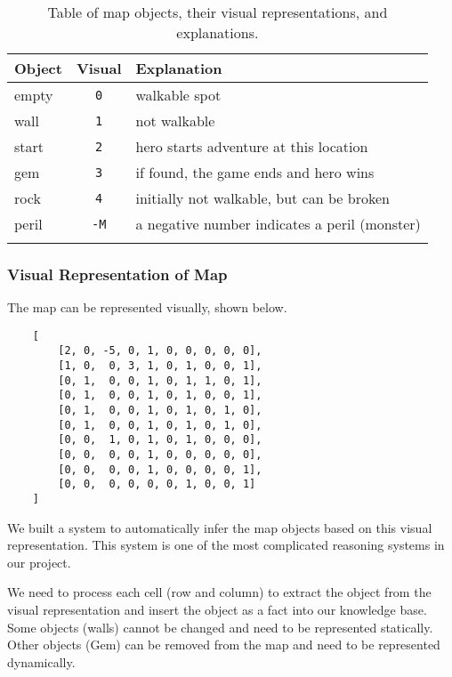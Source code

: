 \documentclass[10pt]{article}
\begin{document}
\begin{table}[h!]
\centering
\begin{tabular}{l c l}
\Xhline{1.5pt}
\textbf{Object} & \textbf{Visual} & \textbf{Explanation} \\
\hline
empty  & \texttt{0}     & walkable spot                                 \\
wall   & \texttt{1}     & not walkable                                  \\
start  & \texttt{2}     & hero starts adventure at this location        \\
gem    & \texttt{3}     & if found, the game ends and hero wins         \\
rock   & \texttt{4}     & initially not walkable, but can be broken     \\
peril  & \texttt{-M}    & a negative number indicates a peril (monster) \\
\Xhline{1.5pt}
\end{tabular}
\caption{Table of map objects, their visual representations, and explanations.}
\label{objects}
\end{table}


\subsubsection*{Visual Representation of Map}

The map can be represented visually, shown below.

\begin{verbatim}
    [
        [2, 0, -5, 0, 1, 0, 0, 0, 0, 0],
        [1, 0,  0, 3, 1, 0, 1, 0, 0, 1],
        [0, 1,  0, 0, 1, 0, 1, 1, 0, 1],
        [0, 1,  0, 0, 1, 0, 1, 0, 0, 1],
        [0, 1,  0, 0, 1, 0, 1, 0, 1, 0],
        [0, 1,  0, 0, 1, 0, 1, 0, 1, 0],
        [0, 0,  1, 0, 1, 0, 1, 0, 0, 0],
        [0, 0,  0, 0, 1, 0, 0, 0, 0, 0],
        [0, 0,  0, 0, 1, 0, 0, 0, 0, 1],
        [0, 0,  0, 0, 0, 0, 1, 0, 0, 1]
    ]
\end{verbatim}

We built a system to automatically infer the map objects based on this visual representation. This system is one of the most complicated reasoning systems in our project.

We need to process each cell (row and column) to extract the object from the visual representation and insert the object as a fact into our knowledge base. Some objects (walls) cannot be changed and need to be represented statically. Other objects (Gem) can be removed from the map and need to be represented dynamically.
\end{document}

